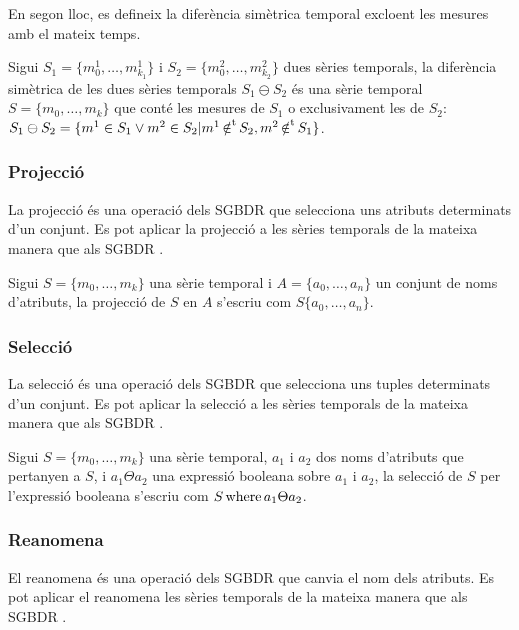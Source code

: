 En segon lloc, es defineix la diferència simètrica temporal excloent les
mesures amb el mateix temps.
\begin{definition}
  Sigui $S_1=\{m_0^1, \dotsc, m_{k_1}^1\}$ i $S_2=\{m_0^2, \dotsc,
  m_{k_2}^2\}$ dues sèries temporals, la diferència simètrica de les
  dues sèries temporals $S_1 \ominus S_2$ és una sèrie temporal
  $S=\{m_0, \dotsc, m_k\}$ que conté les mesures de $S_1$ o
  exclusivament les de $S_2$: $S_1 \ominus S_2 = \{ m^1 \in S_1 \vee
  m^2 \in S_2 | m^1 \operatorname*{\notin^t} S_2, m^2 \operatorname*{\notin^t} S_1 \}$.
\end{definition}



\subsubsection{Projecció}

La projecció és una operació dels SGBDR que selecciona uns atributs
determinats d'un conjunt. Es pot aplicar la projecció a les sèries
temporals de la mateixa manera que als
SGBDR \parencite{date:introduction}. 

Sigui $S =\{m_0, \dotsc, m_k\}$ una sèrie temporal i $A=\{a_0, \dotsc,
a_n\}$ un conjunt de noms d'atributs, la projecció de $S$ en $A$
s'escriu com $S\{a_0, \dotsc, a_n\}$.




\subsubsection{Selecció}

La selecció és una operació dels SGBDR que selecciona uns tuples
determinats d'un conjunt. Es pot aplicar la selecció a les sèries
temporals de la mateixa manera que als
SGBDR \parencite{date:introduction}. 

Sigui $S =\{m_0, \dotsc, m_k\}$ una sèrie temporal, $a_1$ i $a_2$ dos
noms d'atributs que pertanyen a $S$, i $a_1 \Theta a_2$ una expressió
booleana sobre $a_1$ i $a_2$, la selecció de $S$ per l'expressió
booleana s'escriu com $S \operatorname*{where} a_1 \Theta a_2$.


\subsubsection{Reanomena}

El reanomena és una operació dels SGBDR que canvia el nom dels
atributs. Es pot aplicar el reanomena les sèries temporals de la
mateixa manera que als SGBDR \parencite{date:introduction}.

